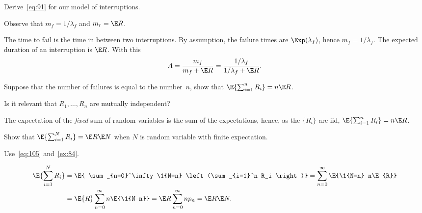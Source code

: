 \begin{exercise}\label{ex:80}
 Derive~\cref{eq:91} for our model of interruptions.
\begin{hint}
 Observe that $m_f = 1/\lambda_f$ and $m_r = \E R$.
\end{hint}
\begin{solution}
  The time to fail is the time in between two interruptions.
  By assumption, the failure times are $\Exp(\lambda_f)$, hence $m_f = 1/\lambda_f$.
  The expected duration of an interruption is $\E R$.   With this
\begin{equation*}
 A=\frac{m_f}{m_f + \E R}=\frac{1/\lambda_f }{1/\lambda_f + \E R}.
\end{equation*}
\end{solution}
\end{exercise}


\begin{exercise}\label{ex:84}
 Suppose that the number of failures is equal to the number~$n$, show that $\E{\sum_{i=1}^n R_i}=n\E R$.
\begin{hint}
 Is it relevant that $R_1,\ldots, R_n$ are mutually independent?
\end{hint}
\begin{solution}
  The expectation of the \emph{fixed} sum of random variables is  the sum of the expectations,
  hence, as the $\{R_i\}$ are iid,
$\E{\sum_{i=1}^n R_i}= n \E R$.
\end{solution}
\end{exercise}


\begin{exercise}\label{ex:16}
Show
that  $\E{\sum_{i=1}^N R_i }=\E R \E N$  when $N$ is random variable with finite expectation.
\begin{hint}
Use~\cref{eq:105} and~\cref{ex:84}.
\end{hint}
\begin{solution}
\begin{align*}
 \E{\sum_{i=1}^N R_i }
&= \E{ \sum_{n=0}^\infty \1{N=n} \left(\sum_{i=1}^n R_i \right)}
= \sum_{n=0}^\infty \E{\1{N=n} n\E{R}} \\
&= \E{R} \sum_{n=0}^\infty n \E{\1{N=n}} = \E R \sum_{n=0}^\infty n p_n
= \E R \E N.
\end{align*}
\end{solution}
\end{exercise}


